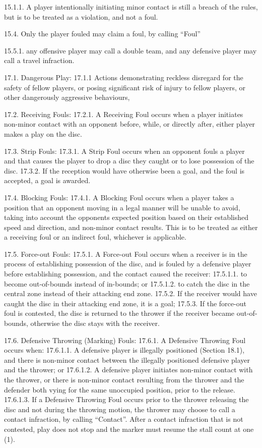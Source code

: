 15.1.1. A player intentionally initiating minor contact is still a breach of the rules, but is to be treated as
a violation, and not a foul.

15.4. Only the player fouled may claim a foul, by calling “Foul”

15.5.1. any offensive player may call a double team, and any defensive player may call a travel infraction.

17.1. Dangerous Play: 
17.1.1 Actions demonstrating reckless disregard for the safety of fellow players, or posing significant
risk of injury to fellow players, or other dangerously aggressive behaviours,

17.2. Receiving Fouls:
    17.2.1. A Receiving Foul occurs when a player initiates non-minor contact with an opponent before, while, or directly after, either player makes a play on the disc.

17.3. Strip Fouls:
    17.3.1. A Strip Foul occurs when an opponent fouls a player and that causes the player to drop a disc they caught or to lose possession of the disc.
    17.3.2. If the reception would have otherwise been a goal, and the foul is accepted, a goal is awarded.

17.4. Blocking Fouls:
17.4.1. A Blocking Foul occurs when a player takes a position that an opponent moving in a legal manner will be unable to avoid, taking into account the opponents expected position based on their established speed and direction, and non-minor contact results. This is to be treated as either a receiving foul or an indirect foul, whichever is applicable.

17.5. Force-out Fouls:
17.5.1. A Force-out Foul occurs when a receiver is in the process of establishing possession of the disc, and is fouled by a defensive player before establishing possession, and the contact caused the receiver:
17.5.1.1. to become out-of-bounds instead of in-bounds; or
17.5.1.2. to catch the disc in the central zone instead of their attacking end zone.
17.5.2. If the receiver would have caught the disc in their attacking end zone, it is a goal;
17.5.3. If the force-out foul is contested, the disc is returned to the thrower if the receiver became
out-of-bounds, otherwise the disc stays with the receiver.

17.6. Defensive Throwing (Marking) Fouls:
17.6.1. A Defensive Throwing Foul occurs when:
17.6.1.1. A defensive player is illegally positioned (Section 18.1), and there is non-minor contact
between the illegally positioned defensive player and the thrower; or
17.6.1.2. A defensive player initiates non-minor contact with the thrower, or there is non-minor
contact resulting from the thrower and the defender both vying for the same unoccupied
position, prior to the release.
17.6.1.3. If a Defensive Throwing Foul occurs prior to the thrower releasing the disc and not
during the throwing motion, the thrower may choose to call a contact infraction, by
calling “Contact”. After a contact infraction that is not contested, play does not stop and
the marker must resume the stall count at one (1).

